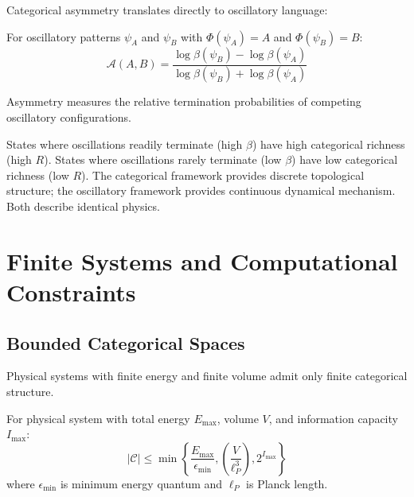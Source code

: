 Categorical asymmetry translates directly to oscillatory language:

\begin{proposition}
\label{prop:oscillatory_asymmetry}
For oscillatory patterns $\psi_A$ and $\psi_B$ with $\Phi(\psi_A) = A$ and $\Phi(\psi_B) = B$:
\begin{equation}
\mathcal{A}(A, B) = \frac{\log \beta(\psi_B) - \log \beta(\psi_A)}{\log \beta(\psi_B) + \log \beta(\psi_A)}
\end{equation}

Asymmetry measures the relative termination probabilities of competing oscillatory configurations.
\end{proposition}

States where oscillations readily terminate (high $\beta$) have high categorical richness (high $R$). States where oscillations rarely terminate (low $\beta$) have low categorical richness (low $R$). The categorical framework provides discrete topological structure; the oscillatory framework provides continuous dynamical mechanism. Both describe identical physics.

\section{Finite Systems and Computational Constraints}

\subsection{Bounded Categorical Spaces}

Physical systems with finite energy and finite volume admit only finite categorical structure.

\begin{theorem}
\label{thm:finite_categorical}
For physical system with total energy $E_{\text{max}}$, volume $V$, and information capacity $I_{\text{max}}$:
\begin{equation}
|\mathcal{C}| \leq \min\left\{ \frac{E_{\text{max}}}{\epsilon_{\text{min}}}, \left(\frac{V}{\ell_P^3}\right), 2^{I_{\text{max}}} \right\}
\end{equation}
where $\epsilon_{\text{min}}$ is minimum energy quantum and $\ell_P$ is Planck length.
\end{theorem}

